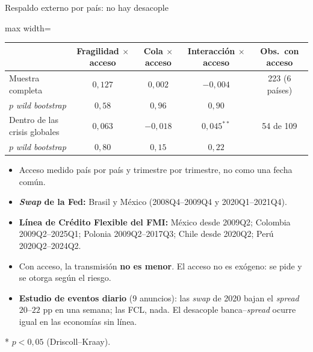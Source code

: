 \documentclass[aspectratio=169]{beamer}
\begin{document}
\begin{frame}{Respaldo externo por país: no hay desacople}
\centering
\footnotesize
\begin{adjustbox}{max width=\textwidth}
\begin{tabular}{l ccc c}
\toprule
 & Fragilidad $\times$ acceso & Cola $\times$ acceso & Interacción $\times$ acceso & Obs.\ con acceso \\
\midrule
Muestra completa & $0{,}127$ & $0{,}002$ & $-0{,}004$ & 223 (6 países) \\
\quad $p$ \textit{wild bootstrap} & $0{,}58$ & $0{,}96$ & $0{,}90$ & \\
Dentro de las crisis globales & $0{,}063$ & $-0{,}018$ & $0{,}045^{**}$ & 54 de 109 \\
\quad $p$ \textit{wild bootstrap} & $0{,}80$ & $0{,}15$ & $0{,}22$ & \\
\bottomrule
\end{tabular}
\end{adjustbox}
\vspace{4pt}
\begin{itemize}\small
\item Acceso medido país por país y trimestre por trimestre, no como una fecha común.
\item \textbf{\textit{Swap} de la Fed:} Brasil y México (2008Q4--2009Q4 y 2020Q1--2021Q4).
\item \textbf{Línea de Crédito Flexible del FMI:} México desde 2009Q2; Colombia 2009Q2--2025Q1; Polonia 2009Q2--2017Q3; Chile desde 2020Q2; Perú 2020Q2--2024Q2.
\item Con acceso, la transmisión \textbf{no es menor}. El acceso no es exógeno: se pide y se otorga según el riesgo.
\item \textbf{Estudio de eventos diario} (9 anuncios): las \textit{swap} de 2020 bajan el \textit{spread} $20$--$22$ pp en una semana; las FCL, nada. El desacople banca--\textit{spread} ocurre igual en las economías sin línea.
\end{itemize}
{\scriptsize ** $p<0{,}05$ (Driscoll--Kraay).\par}
\end{frame}
\end{document}
